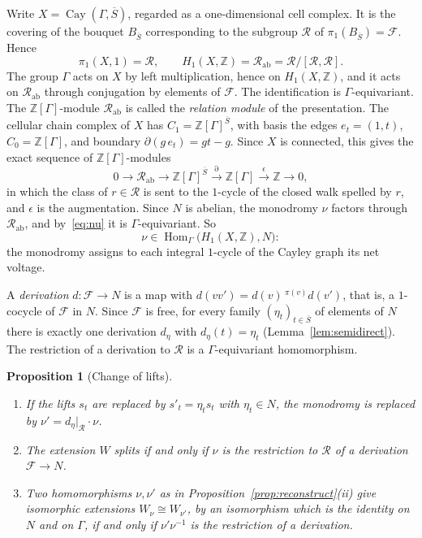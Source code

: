 \documentclass[12pt,letterpaper]{article}
\numberwithin{equation}{section}
\theoremstyle{plain}
\newtheorem{proposition}[theorem]{Proposition}
\theoremstyle{definition}
\newcommand{\Z}{\mathbb{Z}}
\newcommand{\act}[2]{{}^{#1}\!#2}          %
\newcommand{\fr}{\mathcal{F}}             %
\newcommand{\rel}{\mathcal{R}}            %
\DeclareMathOperator{\Hom}{Hom}
\DeclareMathOperator{\Cay}{Cay}
\begin{document}
Write $X=\Cay(\Gamma,\overline{S})$, regarded as a one-dimensional cell
complex. It is the covering of the bouquet $B_{\overline{S}}$
corresponding to the subgroup $\rel$ of
$\pi_1(B_{\overline{S}})=\fr$. Hence
\[
\pi_1(X,1)=\rel,\qquad H_1(X,\Z)=\rel_{\mathrm{ab}}=\rel/[\rel,\rel].
\]
The group $\Gamma$ acts on $X$ by left multiplication, hence on
$H_1(X,\Z)$, and it acts on $\rel_{\mathrm{ab}}$ through conjugation by
elements of $\fr$. The identification is $\Gamma$-equivariant. The
$\Z[\Gamma]$-module $\rel_{\mathrm{ab}}$ is called the \emph{relation
module} of the presentation. The cellular chain complex of $X$ has
$C_1=\Z[\Gamma]^{\overline{S}}$, with basis the edges $e_t=(1,t)$,
$C_0=\Z[\Gamma]$, and boundary $\partial(g\,e_t)=gt-g$. Since $X$ is
connected, this gives the exact sequence of $\Z[\Gamma]$-modules
\cite[Ch.~II, \S5]{Br82}
\begin{equation}\label{eq:relseq}
0\longrightarrow\rel_{\mathrm{ab}}\longrightarrow
\Z[\Gamma]^{\overline{S}}\overset{\partial}{\longrightarrow}\Z[\Gamma]
\overset{\epsilon}{\longrightarrow}\Z\longrightarrow0 ,
\end{equation}
in which the class of $r\in\rel$ is sent to the $1$-cycle of the closed
walk spelled by $r$, and $\epsilon$ is the augmentation. Since $N$ is
abelian, the monodromy $\nu$ factors through $\rel_{\mathrm{ab}}$, and
by~\eqref{eq:nu} it is $\Gamma$-equivariant. So
\[
\nu\in\Hom_\Gamma\bigl(H_1(X,\Z),N\bigr):
\]
the monodromy assigns to each integral $1$-cycle of the Cayley graph its
net voltage.

A \emph{derivation} $d:\fr\to N$ is a map with
$d(vv')=d(v)\,\act{\pi(v)}{d(v')}$, that is, a $1$-cocycle of $\fr$ in
$N$. Since $\fr$ is free, for every family $(\eta_t)_{t\in\overline{S}}$
of elements of $N$ there is exactly one derivation $d_\eta$ with
$d_\eta(t)=\eta_t$ (Lemma~\ref{lem:semidirect}). The restriction of a
derivation to $\rel$ is a $\Gamma$-equivariant homomorphism.

\begin{proposition}[Change of lifts]\label{prop:lifts}
\begin{enumerate}[label=\textup{(\roman*)},itemsep=1pt]
\item If the lifts $s_t$ are replaced by $s'_t=\eta_ts_t$ with
$\eta_t\in N$, the monodromy is replaced by $\nu'=d_\eta|_{\rel}\cdot\nu$.
\item The extension $W$ splits if and only if $\nu$ is the restriction to
$\rel$ of a derivation $\fr\to N$.
\item Two homomorphisms $\nu,\nu'$ as in
Proposition~\ref{prop:reconstruct}\textup{(ii)} give isomorphic extensions
$W_\nu\cong W_{\nu'}$, by an isomorphism which is the identity on $N$ and
on $\Gamma$, if and only if $\nu'\nu^{-1}$ is the restriction of a
derivation.
\end{enumerate}
\end{proposition}
\end{document}
